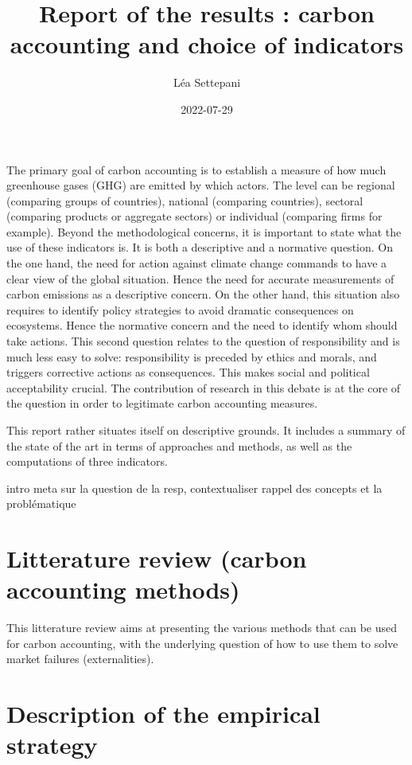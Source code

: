 \documentclass[
]{article}
\title{Report of the results : carbon accounting and choice of
indicators}
\author{Léa Settepani}
\date{2022-07-29}
\begin{document}
\maketitle

The primary goal of carbon accounting is to establish a measure of how
much greenhouse gases (GHG) are emitted by which actors. The level can
be regional (comparing groups of countries), national (comparing
countries), sectoral (comparing products or aggregate sectors) or
individual (comparing firms for example). Beyond the methodological
concerns, it is important to state what the use of these indicators is.
It is both a descriptive and a normative question. On the one hand, the
need for action against climate change commands to have a clear view of
the global situation. Hence the need for accurate measurements of carbon
emissions as a descriptive concern. On the other hand, this situation
also requires to identify policy strategies to avoid dramatic
consequences on ecosystems. Hence the normative concern and the need to
identify whom should take actions. This second question relates to the
question of responsibility and is much less easy to solve:
responsibility is preceded by ethics and morals, and triggers corrective
actions as consequences. This makes social and political acceptability
crucial. The contribution of research in this debate is at the core of
the question in order to legitimate carbon accounting measures.

This report rather situates itself on descriptive grounds. It includes a
summary of the state of the art in terms of approaches and methods, as
well as the computations of three indicators.

intro meta sur la question de la resp, contextualiser rappel des
concepts et la problématique

\hypertarget{litterature-review-carbon-accounting-methods}{%
\section{Litterature review (carbon accounting
methods)}\label{litterature-review-carbon-accounting-methods}}

This litterature review aims at presenting the various methods that can
be used for carbon accounting, with the underlying question of how to
use them to solve market failures (externalities).

\hypertarget{description-of-the-empirical-strategy}{%
\section{Description of the empirical
strategy}\label{description-of-the-empirical-strategy}}
\end{document}
